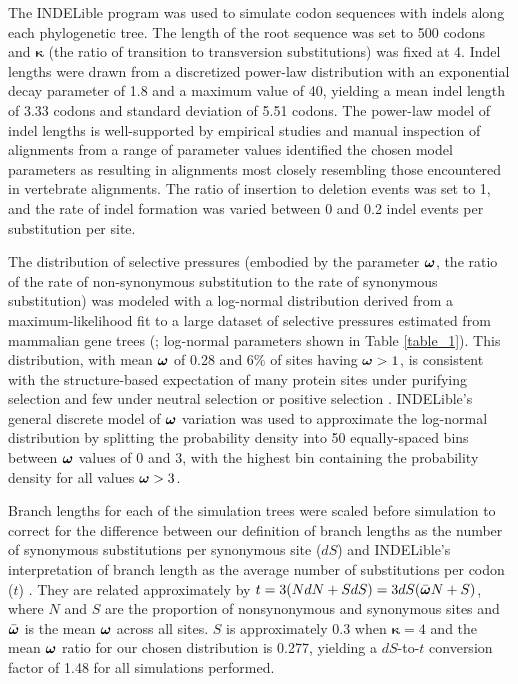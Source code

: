 \documentclass{article}
\begin{document}
The INDELible program \citep{Fletcher2009INDELible} was used to
simulate codon sequences with indels along each phylogenetic tree. The
length of the root sequence was set to 500 codons and $\bm{\kappa}$ (the
ratio of transition to transversion substitutions) was fixed at 4.
Indel lengths were drawn from a discretized
power-law distribution with an exponential decay parameter of 1.8 and
a maximum value of 40, yielding a mean indel length of 3.33 codons and
standard deviation of 5.51 codons. The power-law model of indel
lengths is well-supported by empirical studies
\citep{Benner1993Empirical,Cartwright2009Problems} and manual
inspection of alignments from a range of parameter values identified
the chosen model parameters as resulting in alignments most closely
resembling those encountered in vertebrate alignments. The ratio of
insertion to deletion events was set to 1, and the rate of indel
formation was varied between 0 and 0.2 indel events per substitution
per site.

The distribution of \sw selective pressures (embodied by the parameter
$\bm{\omega}$, the ratio of the rate of non-synonymous substitution to the
rate of synonymous substitution) was modeled with a log-normal
distribution derived from a maximum-likelihood fit to a large dataset
of \sw selective pressures estimated from mammalian gene trees
(\citeyearpar{LindbladToh2011High}; log-normal parameters shown in Table
\ref{table_1}). This distribution, with mean $\bm{\omega}$ of 0.28 and 6\% of
sites having $\bm{\omega}>1$, is consistent with the structure-based
expectation of many protein sites under purifying selection and few
under neutral selection or positive selection
\citep{Smith1970Natural,Kimura1974SomePrinciples}. INDELible's general
discrete model of \sw $\bm{\omega}$ variation was used to approximate the
log-normal distribution by splitting the probability density into 50
equally-spaced bins between $\bm{\omega}$ values of 0 and 3, with the highest
bin containing the probability density for all values $\bm{\omega}>3$.

Branch lengths for each of the simulation trees were scaled before
simulation to correct for the difference between our definition of
branch lengths as the number of synonymous substitutions per
synonymous site ($dS$) and INDELible's interpretation of branch length
as the average number of substitutions per codon ($t$)
\citep{Fletcher2010Effect}. They are related approximately by
$t=3(NdN+SdS) = 3dS(\bar{\bm{\omega}{}}N+S)$, where $N$ and $S$ are the
proportion of nonsynonymous and synonymous sites and $\bar{\bm{\omega}}$ is
the mean $\bm{\omega}$ across all sites. $S$ is approximately 0.3 when
$\bm{\kappa}=4$ \citep{Yang1998Synonymous} and the mean $\bm{\omega}$ ratio
for our chosen distribution is 0.277, yielding a $dS$-to-$t$
conversion factor of 1.48 for all simulations performed.
\end{document}
